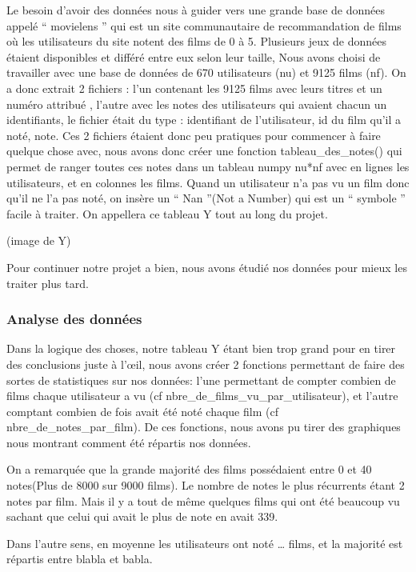 \documentclass[a4paper,10pt]{article}
\begin{document}
Le besoin d'avoir des données nous à guider vers une grande base de données appelé `` movielens '' qui est un site communautaire de recommandation de films où les utilisateurs du site notent des films de 0 à 5. 
Plusieurs jeux de données étaient disponibles et différé entre eux selon leur taille, 
Nous avons choisi de travailler avec une base de données de 670 utilisateurs (nu) et 9125 films (nf). 
On a donc extrait 2 fichiers : l’un contenant les 9125 films avec leurs titres et un numéro attribué , 
l’autre avec les notes des utilisateurs qui avaient chacun un identifiants, 
le fichier était du type : identifiant de l’utilisateur, id du film qu’il a noté, note.
Ces 2 fichiers étaient donc peu pratiques pour commencer à faire quelque chose avec, 
nous avons donc créer une fonction tableau\_des\_notes() qui permet de ranger toutes ces notes dans un tableau numpy nu*nf avec en lignes les utilisateurs, 
et en colonnes les films. Quand un utilisateur n’a pas vu un film donc qu’il ne l’a pas noté, 
on insère un `` Nan ''(Not a Number) qui est un `` symbole '' facile à traiter. On appellera ce tableau Y tout au long du projet.

(image de Y)


Pour continuer notre projet a bien, nous avons étudié nos données pour mieux les traiter plus tard.
\subsubsection{Analyse des données}
Dans la logique des choses, notre tableau Y étant bien trop grand pour en tirer des conclusions 
juste à l’œil, nous avons créer 2 fonctions permettant de faire des sortes de statistiques sur nos données:
l’une permettant de compter combien de films chaque utilisateur a vu (cf nbre\_de\_films\_vu\_par\_utilisateur), 
et l’autre comptant combien de fois avait été noté chaque film (cf nbre\_de\_notes\_par\_film).
De ces fonctions, nous avons pu tirer des graphiques nous montrant comment été répartis nos données.


On a remarquée que la grande majorité des films possédaient entre 0 et 40 notes(Plus de 8000 sur 9000 films).
Le nombre de notes le plus récurrents étant 2 notes par film. Mais il y a tout de même quelques films qui ont été beaucoup vu sachant que celui qui avait le plus de note en avait 339.



Dans l’autre sens, en moyenne les utilisateurs ont noté … films, et la majorité est répartis entre blabla et babla.
\end{document}
